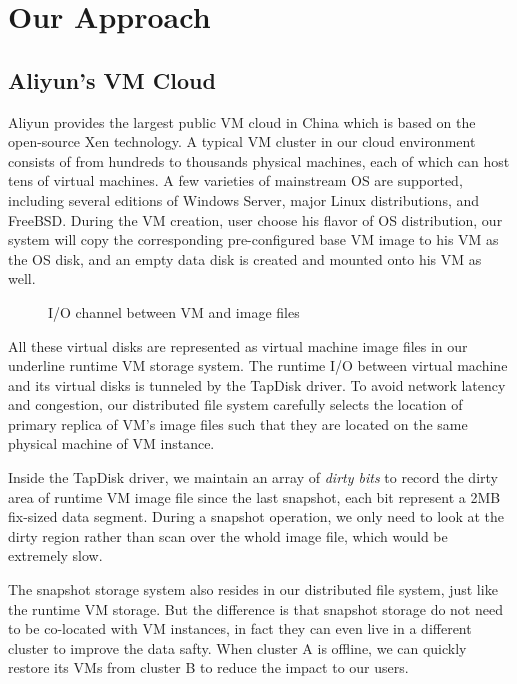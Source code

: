 \section{Our Approach}
\subsection{Aliyun's VM Cloud}
Aliyun provides the largest public VM cloud in China which is based on the 
open-source Xen technology. A typical VM cluster in our cloud environment
consists of from hundreds to thousands physical machines, each of which can
host tens of virtual machines. A few varieties of mainstream OS are supported,
including several editions of Windows Server, major Linux distributions, and FreeBSD.
During the VM creation, user choose his flavor of OS distribution, our system will
copy the corresponding pre-configured base VM image to his VM as the OS disk, 
and an empty data disk is created and mounted onto his VM as well. 

\begin{figure}
  \centering
  \caption{I/O channel between VM and image files}
  \label{fig:tapdisk}
\end{figure}

All these virtual disks are represented as virtual machine image files in our
underline runtime VM storage system. The runtime I/O between virtual machine and its virtual
disks is tunneled by the TapDisk driver. To avoid network latency and congestion, 
our distributed file system carefully selects the location of primary replica of VM's 
image files such that they are located on the same physical machine of VM instance.

Inside the TapDisk driver, we maintain an array of \emph{dirty bits} to record the dirty area
of runtime VM image file since the last snapshot, each bit represent a 2MB fix-sized
data segment. During a snapshot operation, we only need to look at the dirty region
rather than scan over the whold image file, which would be extremely slow.

The snapshot storage system also resides in our distributed file system, just like the 
runtime VM storage. But the difference is that snapshot storage do not need to be
co-located with VM instances, in fact they can even live in a different cluster to improve the 
data safty. When cluster A is offline, we can quickly restore its VMs from cluster B
to reduce the impact to our users.

